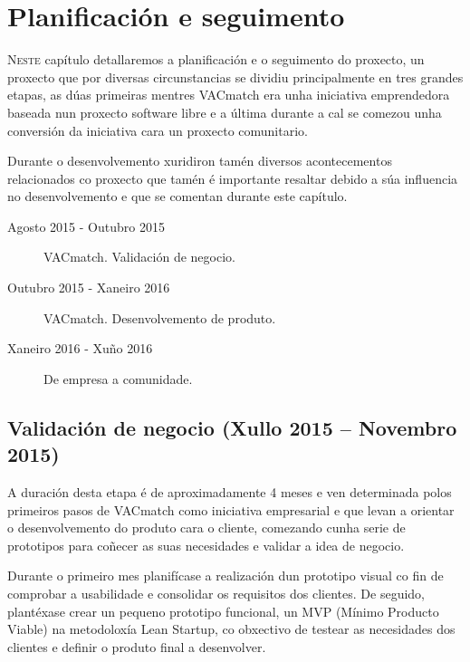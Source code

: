 \chapter{Planificación e seguimento}
\minitoc


  \lettrine{N}{este} capítulo detallaremos a planificación e o seguimento 
do proxecto, un proxecto que por diversas circunstancias se dividiu 
principalmente en tres grandes etapas, as dúas primeiras mentres VACmatch era 
unha iniciativa emprendedora baseada nun proxecto software libre e a última 
durante a cal se comezou unha conversión da iniciativa cara un proxecto 
comunitario.

  Durante o desenvolvemento xuridiron tamén diversos acontecementos 
relacionados co proxecto que tamén é importante resaltar debido a súa 
influencia no desenvolvemento e que se comentan durante este capítulo.

  \begin{description}
    \item [Agosto 2015 - Outubro 2015] VACmatch. Validación de negocio.
    \item [Outubro 2015 - Xaneiro 2016] VACmatch. Desenvolvemento de produto.
    \item [Xaneiro 2016 - Xuño 2016] De empresa a comunidade.
  \end{description}


  \section{Validación de negocio (Xullo 2015 -- Novembro 2015)}
  A duración desta etapa é de aproximadamente 4 meses e ven determinada polos 
primeiros pasos de VACmatch como iniciativa empresarial e que levan a orientar 
o desenvolvemento do produto cara o cliente, comezando cunha serie de 
prototipos para coñecer as suas necesidades e validar a idea de 
negocio.

  Durante o primeiro mes planifícase a realización dun prototipo visual co 
fin de comprobar a usabilidade e consolidar os requisitos dos clientes.
  De seguido, plantéxase crear un pequeno prototipo funcional, un MVP (Mínimo 
Producto Viable) na metodoloxía Lean Startup, co obxectivo de testear as 
necesidades dos clientes e definir o produto final a desenvolver.

